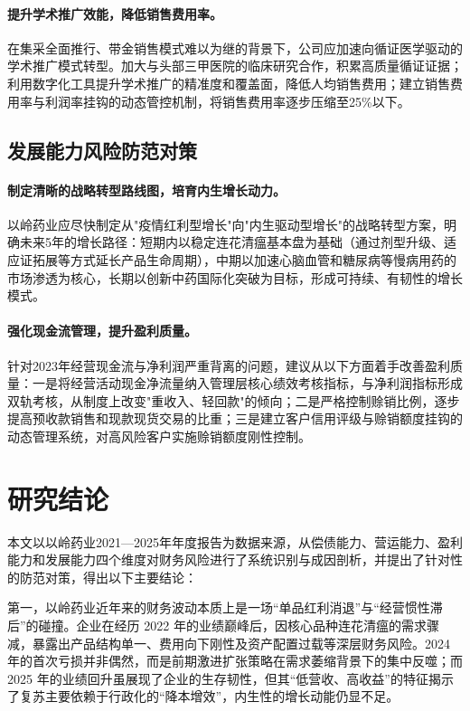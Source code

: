 \documentclass[12pt,a4paper,fontset=windows,UTF8]{ctexart}
\begin{document}
\paragraph*{提升学术推广效能，降低销售费用率。}
在集采全面推行、带金销售模式难以为继的背景下，公司应加速向循证医学驱动的学术推广模式转型。加大与头部三甲医院的临床研究合作，积累高质量循证证据；利用数字化工具提升学术推广的精准度和覆盖面，降低人均销售费用；建立销售费用率与利润率挂钩的动态管控机制，将销售费用率逐步压缩至25\%以下。

\subsection{发展能力风险防范对策}
\paragraph*{制定清晰的战略转型路线图，培育内生增长动力。}
以岭药业应尽快制定从"疫情红利型增长"向"内生驱动型增长"的战略转型方案，明确未来5年的增长路径：短期内以稳定连花清瘟基本盘为基础（通过剂型升级、适应证拓展等方式延长产品生命周期），中期以加速心脑血管和糖尿病等慢病用药的市场渗透为核心，长期以创新中药国际化突破为目标，形成可持续、有韧性的增长模式。

\paragraph*{强化现金流管理，提升盈利质量。}
针对2023年经营现金流与净利润严重背离的问题，建议从以下方面着手改善盈利质量：一是将经营活动现金净流量纳入管理层核心绩效考核指标，与净利润指标形成双轨考核，从制度上改变"重收入、轻回款"的倾向；二是严格控制赊销比例，逐步提高预收款销售和现款现货交易的比重；三是建立客户信用评级与赊销额度挂钩的动态管理系统，对高风险客户实施赊销额度刚性控制。

\section{研究结论}
本文以以岭药业2021—2025年年度报告为数据来源，从偿债能力、营运能力、盈利能力和发展能力四个维度对财务风险进行了系统识别与成因剖析，并提出了针对性的防范对策，得出以下主要结论：

第一，以岭药业近年来的财务波动本质上是一场“单品红利消退”与“经营惯性滞后”的碰撞。企业在经历 2022 年的业绩巅峰后，因核心品种连花清瘟的需求骤减，暴露出产品结构单一、费用向下刚性及资产配置过载等深层财务风险。2024 年的首次亏损并非偶然，而是前期激进扩张策略在需求萎缩背景下的集中反噬；而 2025 年的业绩回升虽展现了企业的生存韧性，但其“低营收、高收益”的特征揭示了复苏主要依赖于行政化的“降本增效”，内生性的增长动能仍显不足。
\end{document}
